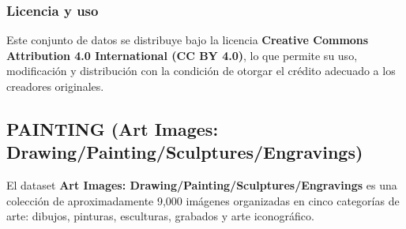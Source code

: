 \subsubsection{Licencia y uso}
Este conjunto de datos se distribuye bajo la licencia
\textbf{Creative Commons Attribution 4.0 International (CC BY 4.0)}, lo que permite su uso, modificación y distribución
con la condición de otorgar el crédito adecuado a los creadores originales.


\subsection{PAINTING (Art Images: Drawing/Painting/Sculptures/Engravings)}\label{subsec:painting}
El dataset \textbf{Art Images: Drawing/Painting/Sculptures/Engravings} es una colección de aproximadamente 9,000
imágenes organizadas en cinco categorías de arte: dibujos, pinturas, esculturas, grabados y arte iconográfico.


